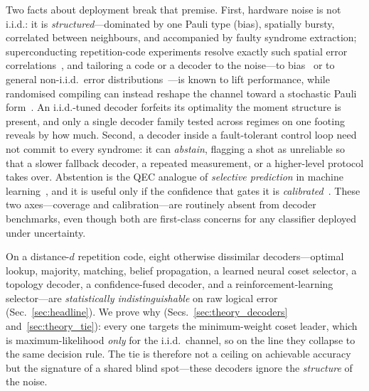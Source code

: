 \documentclass[reprint,aps,prxquantum,amsmath,amssymb,floatfix,nofootinbib,longbibliography]{revtex4-2}
\theoremstyle{definition}
\theoremstyle{remark}
\theoremstyle{plain}
\begin{document}
Two facts about deployment break that premise. First, hardware noise is not i.i.d.: it is \emph{structured}---dominated by one Pauli type (bias), spatially bursty, correlated between neighbours, and accompanied by faulty syndrome extraction; superconducting repetition-code experiments resolve exactly such spatial error correlations~\cite{google2021exponential}, and tailoring a code or a decoder to the noise---to bias~\cite{tuckett2018ultrahigh,bonilla2021xzzx} or to general non-i.i.d.\ error distributions~\cite{tiurev2023correcting}---is known to lift performance, while randomised compiling can instead reshape the channel toward a stochastic Pauli form~\cite{wallman2016noise}. An i.i.d.-tuned decoder forfeits its optimality the moment structure is present, and only a single decoder family tested across regimes on one footing reveals by how much. Second, a decoder inside a fault-tolerant control loop need not commit to every syndrome: it can \emph{abstain}, flagging a shot as unreliable so that a slower fallback decoder, a repeated measurement, or a higher-level protocol takes over. Abstention is the QEC analogue of \emph{selective prediction} in machine learning~\cite{chow1970optimum,elyaniv2010foundations,geifman2017selective}, and it is useful only if the confidence that gates it is \emph{calibrated}~\cite{guo2017calibration,naeini2015obtaining}. These two axes---coverage and calibration---are routinely absent from decoder benchmarks, even though both are first-class concerns for any classifier deployed under uncertainty.

On a distance-$d$ repetition code, eight otherwise dissimilar decoders---optimal lookup, majority, matching, belief propagation, a learned neural coset selector, a topology decoder, a confidence-fused decoder, and a reinforcement-learning selector---are \emph{statistically indistinguishable} on raw logical error (Sec.~\ref{sec:headline}). We prove why (Secs.~\ref{sec:theory_decoders} and~\ref{sec:theory_tie}): every one targets the minimum-weight coset leader, which is maximum-likelihood \emph{only} for the i.i.d.\ channel, so on the line they collapse to the same decision rule. The tie is therefore not a ceiling on achievable accuracy but the signature of a shared blind spot---these decoders ignore the \emph{structure} of the noise.
\end{document}
